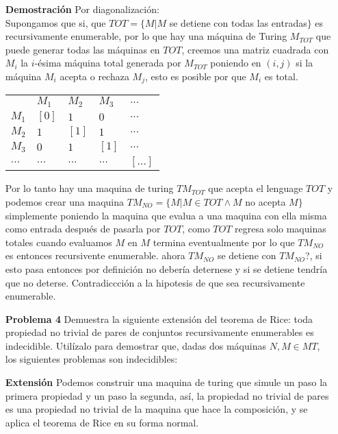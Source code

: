\documentclass{article}
\begin{document}
\begin{enumerate}
\item[\bf{Demostración}] Por diagonalización:\\

Supongamos que si, que $TOT = \{ M | M $ se detiene con todas las entradas$ \}$ es recursivamente enumerable, por lo que hay una máquina de Turing $M_{TOT}$ que puede generar todas las máquinas en $TOT$, creemos una matriz cuadrada con $M_i$ la $i$-ésima máquina total generada por $M_{TOT}$ poniendo en $(i,j)$ si la máquina $M_i$ acepta o rechaza $M_j$, esto es posible por que $M_i$ es total.

\begin{tabular}{|l||l|l|l|l|}
  \hline
          & $M_1$ & $M_2$ & $M_3$ & $...$ \\
   $M_1$  & $[0]$   & $1$   & $0$   & $...$ \\
   $M_2$  & $1$   & $[1]$   & $1$   & $...$ \\
   $M_3$  & $0$   & $1$   & $[1]$   & $...$ \\
   $...$  & $...$ & $...$ & $...$ & $[...]$ \\ 
  \hline  
\end{tabular}

Por lo tanto hay una maquina de turing $TM_{TOT}$ que acepta el lenguage $TOT$ y podemos crear una maquina $TM_{NO} = \{M | M \in TOT \wedge M$ no acepta $M \}$ simplemente poniendo la maquina que evalua a una maquina con ella misma como entrada después de pasarla por $TOT$, como $TOT$ regresa solo maquinas totales cuando evaluamos $M$ en $M$ termina eventualmente por lo que $TM_{NO}$ es entonces recursivente enumerable.
ahora $TM_{NO}$ se detiene con $TM_{NO}$?, si esto pasa entonces por definición no debería deternese y si se detiene tendría que no deterse. Contradiccción a la hipotesis de que sea recursivamente enumerable.\\



\item[\bf{Problema 4}]Demuestra la siguiente extensión del teorema de Rice: toda propiedad no trivial de pares de conjuntos recursivamente enumerables es indecidible. Utilízalo para demostrar que, dadas dos máquinas $N, M \in MT$, los siguientes problemas son indecidibles:

\item[\bf{Extensión}] Podemos construir una maquina de turing que simule un paso la primera propiedad y un paso la segunda, así, la propiedad no trivial de pares es una propiedad no trivial de la maquina que hace la composición, y se aplica el teorema de Rice en su forma normal.


\end{enumerate}
\end{document}
